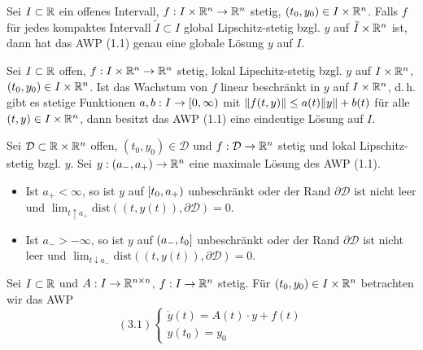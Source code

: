 \documentclass{cheat-sheet}
\newcommand{\D}{\mathcal{D}}
\newcommand{\dist}{\mathrm{dist}} %
\begin{document}

\begin{satz}
  Sei $I \subset \mathbb{R}$ ein offenes Intervall, $f : I \times \mathbb{R}^n \to \mathbb{R}^n$ stetig, $(t_0, y_0) \in I \times \mathbb{R}^n$. Falls $f$ für jedes kompaktes Intervall $\tilde{I} \subset I$ global Lipschitz-stetig bzgl. $y$ auf $\tilde{I} \times \mathbb{R}^n$ ist, dann hat das AWP (1.1) genau eine globale Lösung $y$ auf $I$.
\end{satz}

\begin{satz}
  Sei $I \subset \mathbb{R}$ offen, $f : I \times \mathbb{R}^n \to \mathbb{R}^n$ stetig, lokal Lipschitz-stetig bzgl. $y$ auf $I \times \mathbb{R}^n$, $(t_0, y_0) \in I \times \mathbb{R}^n$. Ist das Wachstum von $f$ linear beschränkt in $y$ auf $I \times \mathbb{R}^n$, d.\,h. gibt es stetige Funktionen $a, b : I \to \left[ 0, \infty \right)$ mit $\lVert f(t, y)\rVert \leq a(t) \lVert y\rVert + b(t)$ für alle $(t, y) \in I \times \mathbb{R}^n$, dann besitzt das AWP (1.1) eine eindeutige Lösung auf $I$.
\end{satz}



\begin{satz}
  Sei $\D \subset \R \times \R^n$ offen, $(t_0, y_0) \in \D$ und $f : \D \to \R^n$ stetig und lokal Lipschitz-stetig bzgl. $y$. Sei $y : \left( a_-, a_+ \right) \to \mathbb{R}^n$ eine maximale Lösung des AWP (1.1).
  \begin{itemize}
    \item Ist $a_+ < \infty$, so ist $y$ auf $\left[ t_0, a_+ \right)$ unbeschränkt
    oder der Rand $\partial \D$ ist nicht
    leer und $\lim_{t \uparrow a_+} \dist((t, y(t)), \partial \D) = 0$.
    \item Ist $a_- > -\infty$, so ist $y$ auf $\left( a_-, t_0 \right]$ unbeschränkt oder der Rand $\partial \D$ ist nicht leer und $\lim_{t \downarrow a_-} \dist((t, y(t)), \partial \D) = 0$.
  \end{itemize}
\end{satz}



\begin{prob}
  Sei $I \subset \mathbb{R}$ und $A : I \to \mathbb{R}^{n \times n}$, $f : I \to \mathbb{R}^n$ stetig. Für $(t_0, y_0) \in I \times \mathbb{R}^n$ betrachten wir das AWP
  \[
    (3.1) \left\{ \begin{array}{l}
    \dot{y}(t) = A(t) \cdot y + f(t)\\
    y(t_0) = y_0
    \end{array} \right.
  \]
\end{prob}
\end{document}
